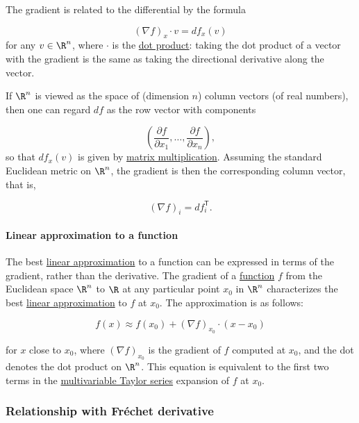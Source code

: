 \documentclass[
]{article}
\begin{document}
The gradient is related to the differential by the formula

\[(\nabla f)_x\cdot v = df_x(v)\] for any \(v\in\R^n\), where \(\cdot\)
is the \href{dot_product}{dot product}: taking the dot product of a
vector with the gradient is the same as taking the directional
derivative along the vector.

If \(\R^n\) is viewed as the space of (dimension \(n\)) column vectors
(of real numbers), then one can regard \(df\) as the row vector with
components

\[\left( \frac{\partial f}{\partial x_1}, \dots, \frac{\partial f}{\partial x_n}\right),\]
so that \(df_x(v)\) is given by \href{matrix_multiplication}{matrix
multiplication}. Assuming the standard Euclidean metric on \(\R^n\), the
gradient is then the corresponding column vector, that is,

\[(\nabla f)_i = df^\mathsf{T}_i.\]

\hypertarget{linear_approximation_to_a_function}{%
\paragraph{Linear approximation to a
function}\label{linear_approximation_to_a_function}}

The best \href{linear_approximation}{linear approximation} to a function
can be expressed in terms of the gradient, rather than the derivative.
The gradient of a \href{function_(mathematics)}{function} \(f\) from the
Euclidean space \(\R^n\) to \(\R\) at any particular point \(x_0\) in
\(\R^n\) characterizes the best \href{linear_approximation}{linear
approximation} to \(f\) at \(x_0\). The approximation is as follows:

\[f(x) \approx f(x_0) + (\nabla f)_{x_0}\cdot(x-x_0)\]

for \(x\) close to \(x_0\), where \((\nabla f)_{x_0}\) is the gradient
of \(f\) computed at \(x_0\), and the dot denotes the dot product on
\(\R^n\). This equation is equivalent to the first two terms in the
\href{Taylor_series\#Taylor_series_in_several_variables}{multivariable
Taylor series} expansion of \(f\) at \(x_0\).

\hypertarget{relationship_with_fruxe9chet_derivative}{%
\subsubsection{Relationship with Fréchet
derivative}\label{relationship_with_fruxe9chet_derivative}}
\end{document}

